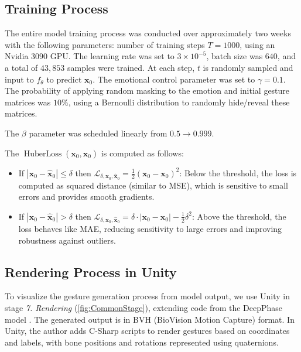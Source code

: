 \subsection{Training Process}

The entire model training process was conducted over approximately two weeks with the following parameters: number of training steps $T = 1000$, using an Nvidia 3090 GPU. The learning rate was set to $3 \times 10^{-5}$, batch size was $640$, and a total of $43,853$ samples were trained. At each step, $t$ is randomly sampled and input to $f_{\theta}$ to predict $\mathbf{x}_{0}$. The emotional control parameter was set to $\gamma = 0.1$. The probability of applying random masking to the emotion and initial gesture matrices was $10\%$, using a Bernoulli distribution to randomly hide/reveal these matrices.

The $\beta$ parameter was scheduled linearly from $0.5 \rightarrow 0.999$.

The $\operatorname{HuberLoss} (\mathbf{x}_{0},  \hat{\mathbf{x}}_{0} )$ is computed as follows:

\begin{itemize}
	\item If $|\mathbf{x}_0 - \hat{\mathbf{x}}_0| \leq \delta$ then $\mathcal{L}_{ \delta, \mathbf{x}_0, \hat{\mathbf{x}}_0} = \frac{1}{2} (\mathbf{x}_0 - \mathbf{x}_0)^2$: Below the threshold, the loss is computed as squared distance (similar to MSE), which is sensitive to small errors and provides smooth gradients.
	
	\item If $|\mathbf{x}_0 - \hat{\mathbf{x}}_0| > \delta$ then $\mathcal{L}_{ \delta, \mathbf{x}_0, \hat{\mathbf{x}}_0}  =  \delta \cdot |\mathbf{x}_0 - \mathbf{x}_0| - \frac{1}{2} \delta^2$: Above the threshold, the loss behaves like MAE, reducing sensitivity to large errors and improving robustness against outliers.
	
\end{itemize}


\subsection{Rendering Process in Unity}
\label{sec:Render}

To visualize the gesture generation process from model output, we use Unity in stage \textit{7. Rendering} (\autoref{fig:CommonStage}), extending code from the DeepPhase model \cite{starke2022deepphase}. The generated output is in BVH (BioVision Motion Capture) format. In Unity, the author adds C-Sharp scripts to render gestures based on coordinates and labels, with bone positions and rotations represented using quaternions.


